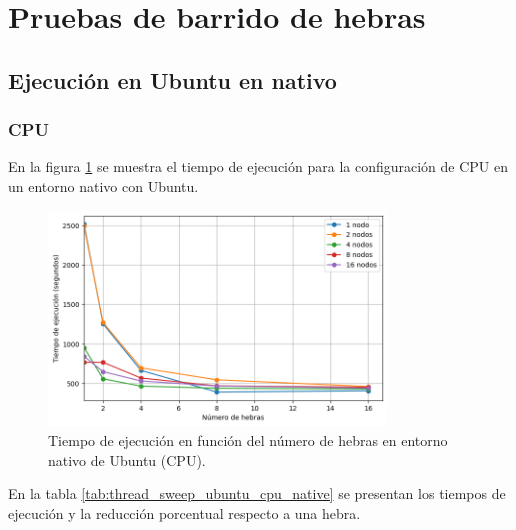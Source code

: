 \section{Pruebas de barrido de hebras}
\subsection{Ejecución en Ubuntu en nativo}
\subsubsection{CPU}

En la figura \ref{fig:thread_sweep_ubuntu_cpu_native_time} se muestra el tiempo de ejecución para la configuración de CPU en un entorno nativo con Ubuntu.

\begin{figure}[ht]
    \centering
    \includegraphics[width=0.8\textwidth]{imagenes/cap5/thread_sweep_ubuntu_cpu_native_time.png}
    \caption{Tiempo de ejecución en función del número de hebras en entorno nativo de Ubuntu (CPU).}
    \label{fig:thread_sweep_ubuntu_cpu_native_time}
\end{figure}

En la tabla \ref{tab:thread_sweep_ubuntu_cpu_native} se presentan los tiempos de ejecución y la reducción porcentual respecto a una hebra.

